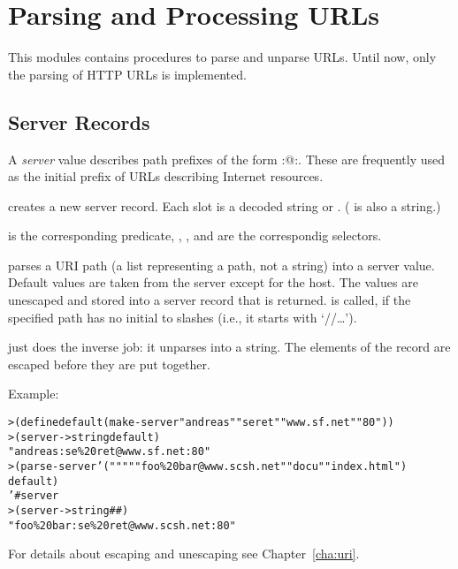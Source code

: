 \chapter{Parsing and Processing URLs}\label{cha:url}
%
This modules contains procedures to parse and unparse URLs.  Until
now, only the parsing of HTTP URLs is implemented.

\section{Server Records}

A \textit{server} value describes path prefixes of the form
:@:. These are
frequently used as the initial prefix of URLs describing Internet
resources.

\begin{desc}
   creates a new server record.  Each slot is a
  decoded string or \sharpf. ( is also a string.)
  
   is the corresponding predicate, ,
  ,  and 
  are the correspondig selectors.
\end{desc}

\begin{desc}
   parses a URI path  (a list representing
  a path, not a string) into a server value.  Default values are taken
  from the server  except for the host.  The values
  are unescaped and stored into a server record that is returned.
   is called, if the specified path has no
  initial to slashes (i.e., it starts with `//\ldots').
  
   just does the inverse job: it unparses
   into a string. The elements of the record
  are escaped before they are put together.  

  Example:
\begin{alltt}
> (define default (make-server "andreas"  "se ret" "www.sf.net" "80"))
> (server->string default)
"andreas:se\%20ret@www.sf.net:80"
> (parse-server '("" "" "foo\%20bar@www.scsh.net" "docu" "index.html") 
                default)
'#{server}
> (server->string ##)
"foo\%20bar:se\%20ret@www.scsh.net:80"
\end{alltt}
%
For details about escaping and unescaping see Chapter~\ref{cha:uri}.
\end{desc}

